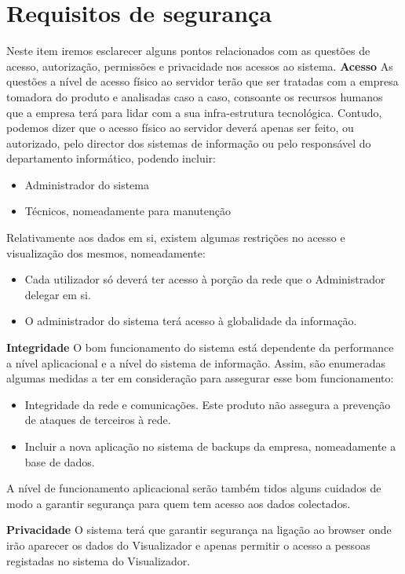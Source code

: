 \section{Requisitos de segurança}
Neste item iremos esclarecer alguns pontos relacionados com as questões de acesso, autorização, permissões e privacidade nos acessos ao sistema.
\textbf{Acesso} As questões a nível de acesso físico ao servidor terão que ser tratadas com a empresa tomadora do produto e analisadas caso a caso,
consoante os recursos humanos que a empresa terá para lidar com a sua infra-estrutura tecnológica.
Contudo, podemos dizer que o acesso físico ao servidor deverá apenas ser feito, ou autorizado, pelo director dos sistemas de
informação ou pelo responsável do departamento informático, podendo incluir:

\begin{itemize}
\item Administrador do sistema
\item Técnicos, nomeadamente para manutenção
\end{itemize}

Relativamente aos dados em si, existem algumas restrições no acesso e visualização dos mesmos, nomeadamente:
\begin{itemize}
\item Cada utilizador só deverá ter acesso à porção da rede que o Administrador delegar em si.
\item O administrador do sistema terá acesso à globalidade da informação.
\end{itemize}

\textbf{Integridade}
O bom funcionamento do sistema está dependente da performance a nível aplicacional e a nível do sistema de informação.
Assim, são enumeradas algumas medidas a ter em consideração para assegurar esse bom funcionamento:
\begin{itemize}
\item Integridade da rede e comunicações. Este produto não assegura a prevenção de ataques de terceiros à rede.
\item Incluir a nova aplicação no sistema de backups da empresa, nomeadamente a base de dados.
\end{itemize}

A nível de funcionamento aplicacional serão também tidos alguns cuidados de modo a garantir segurança para quem tem acesso aos dados colectados.

\textbf{Privacidade}
O sistema terá que garantir segurança na ligação ao browser onde irão aparecer os dados do Visualizador e apenas
permitir o acesso a pessoas registadas no sistema do Visualizador.

